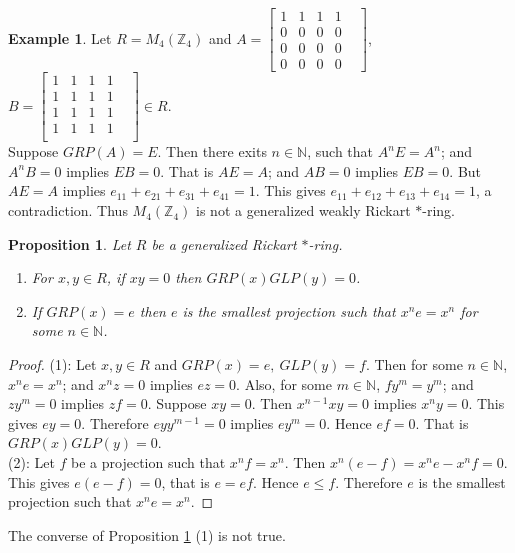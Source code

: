 \documentclass[11pt, one side,emlines]{amsart}
\newtheorem{proposition}[lemma]{Proposition}
\theoremstyle{definition}
\newtheorem{example}[lemma]{Example}
\numberwithin{equation}{section} \thispagestyle{empty} \voffset
\begin{document}
\begin{example} \label{s2ex2} Let $R=M_4(\mathbb{Z}_4)$ and $ A=\begin{bmatrix}
		1&1&1&1&\\
		0&0&0&0&\\
		0&0&0&0&\\
		0&0&0&0&
	\end{bmatrix} $, 
	$ B=\begin{bmatrix}
		1&1&1&1&\\
		1&1&1&1&\\
		1&1&1&1&\\
		1&1&1&1&\\
	\end{bmatrix}  \in R$.\\	
Suppose $GRP(A)=E$. Then there exits $n \in \mathbb N$, such that $A^nE=A^n$; and $A^nB=0$ implies $EB=0$. 
That is  $AE=A$; and $AB=0$ implies $EB=0$. 
But $AE=A$ implies $e_{11}+e_{21}+e_{31}+e_{41}=1$. This gives $e_{11}+e_{12}+e_{13}+e_{14} =1 $, a contradiction.
Thus $ M_4(\mathbb{Z}_4) $ is not a generalized weakly Rickart $*$-ring. 
\end{example}


\begin{proposition} \label{s2pr3} Let $R$ be a generalized  Rickart $*$-ring.  
	\begin{enumerate}
		\item   For $x,y \in R$, if $ xy=0 $ then $GRP(x)GLP(y)=0$.
		\item  If $GRP(x)=e$ then $e$ is the smallest projection such that $x^ne=x^n$ for some $n \in \mathbb N$.
	\end{enumerate}
\end{proposition}
\begin{proof} (1):  Let $x,y\in R $ and $GRP(x)=e,~ GLP(y)=f$.
  Then for some $n\in\mathbb{N} $, $x^ne=x^n$; and $x^nz=0$ implies $ez=0 $.
	Also, for some $m\in\mathbb{N}$, $fy^m=y^m$; and $zy^m=0$ implies $zf=0$.
	Suppose $xy=0$. Then $x^{n-1} xy=0$ implies $x^ny=0$. This gives $ey=0$.
	Therefore $eyy^{m-1}=0$ implies $ey^m=0$. Hence $ef=0$. That is $GRP(x) GLP(y)=0$.\\
	(2): Let $f$ be a projection such that $x^nf=x^n$. Then $x^n(e-f)=x^ne-x^nf=0$. This gives 
	$e(e-f)=0$, that is $e=ef$. Hence $e\leq f$.
	Therefore $e$ is the smallest projection such that $x^ne=x^n$. 
 \end{proof}
 	
    The converse of Proposition \ref{s2pr3} (1) is not true. 
    
\end{document}
